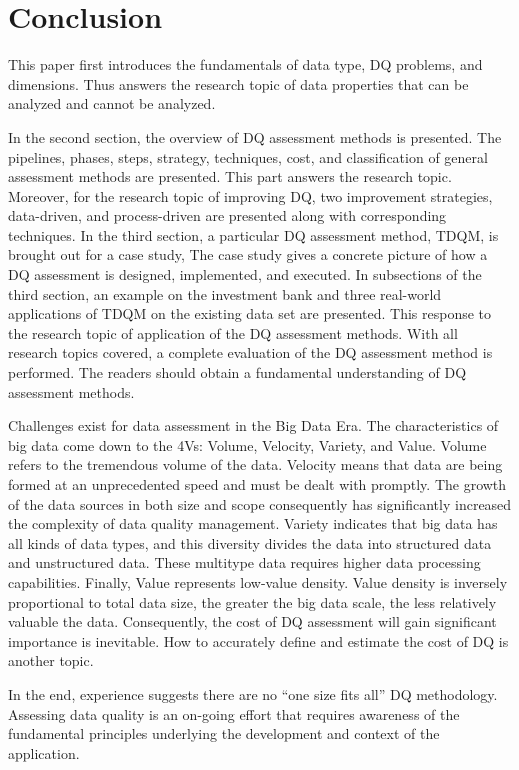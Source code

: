 \documentclass[pdftex,english,oribibl]{llncs}
\begin{document}
\section{Conclusion}
This paper first introduces the fundamentals of data type, DQ problems, and dimensions.  Thus answers the research topic of data properties that can be analyzed and cannot be analyzed.

In the second section, the overview of DQ assessment methods is presented. The pipelines, phases, steps, strategy, techniques, cost, and classification of general assessment methods are presented. This part answers the research topic. Moreover, for the research topic of improving DQ, two improvement strategies, data-driven, and process-driven are presented along with corresponding techniques.
In the third section, a particular DQ assessment method, TDQM, is brought out for a case study, The case study gives a concrete picture of how a DQ assessment is designed, implemented, and executed. In subsections of the third section, an example on the investment bank and three real-world applications of TDQM on the existing data set are presented. This response to the research topic of application of the DQ assessment methods. With all research topics covered, a complete evaluation of the DQ assessment method is performed. The readers should obtain a fundamental understanding of DQ assessment methods.

Challenges exist for data assessment in the Big Data Era. \cite{Katal2013BigData} The characteristics of big data come down to the 4Vs: Volume, Velocity, Variety, and Value. Volume refers to the tremendous volume of the data. Velocity means that data are being formed at an unprecedented speed and must be dealt with promptly.   The growth of the data sources in both size and scope consequently has significantly increased the complexity of data quality management.
Variety indicates that big data has all kinds of data types, and this diversity divides the data into structured data and unstructured data. These multitype data requires higher data processing capabilities.
Finally, Value represents low-value density. Value density is inversely proportional to total data size, the greater the big data scale, the less relatively valuable the data. Consequently, the cost of DQ assessment will gain significant importance is inevitable. How to accurately define and estimate the cost of DQ is another topic.

In the end, experience suggests there are no  “one size fits all”  DQ methodology. Assessing data quality is an on-going effort that requires awareness of the fundamental principles underlying the development and context of the application.


\end{document}

